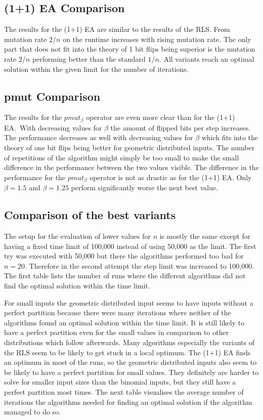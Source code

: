 \subsection{(1+1) EA Comparison}


The results for the (1+1) EA are similar to the results of the RLS. From mutation rate $2/n$ on the runtime increases with rising mutation rate.
The only part that does not fit into the theory of 1 bit flips being superior is the mutation rate $2/n$ performing better than the standard $1/n$.
All variants reach an optimal solution within the given limit for the number of iterations.
\subsection{pmut Comparison}


The results for the $pmut_\beta$ operator are even more clear than for the (1+1) EA.\
With decreasing values for $\beta$ the amount of flipped bits per step increases.
The performance decreases as well with decreasing values for $\beta$ which fits into the theory of one bit flips being better for geometric distributed inputs.
The number of repetitions of the algorithm might simply be too small to make the small difference in the performance between the two values visible.
The difference in the performance for the $pmut_\beta$ operator is not as drastic as for the (1+1) EA.
Only $\beta=1.5$ and $\beta=1.25$ perform significantly worse the next best value.

\subsection{Comparison of the best variants}
% 
% 
The setup for the evaluation of lower values for $n$ is mostly the same except for having a fixed time limit of 100,000 instead of using 50,000 as the limit.
The first try was executed with 50,000 but there the algorithms performed too bad for $n=20$.
Therefore in the second attempt the step limit was increased to 100,000.
The first table lists the number of runs where the different algorithms did not find the optimal solution within the time limit.



For small inputs the geometric distributed input seems to have inputs without a perfect partition because there were many iterations where neither of the algorithms found an optimal solution within the time limit.
It is still likely to have a perfect partition even for the small values in comparison to other distributions which follow afterwards.
Many algorithms especially the variants of the RLS seem to be likely to get stuck in a local optimum.
The (1+1) EA finds an optimum in most of the runs, so the geometric distributed inputs also seem to be likely to have a perfect partition for small values.
They definitely are harder to solve for smaller input sizes than the binomial inputs, but they still have a perfect partition most times.
The next table visualises the average number of iterations the algorithms needed for finding an optimal solution if the algorithm managed to do so.


